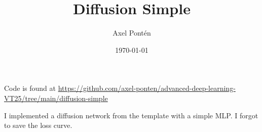 \documentclass[12pt, a4paper]{article}
\title{Diffusion Simple}
\author{Axel Pontén}
\date{\today}
\begin{document}
\maketitle

Code is found at \url{https://github.com/axel-ponten/advanced-deep-learning-VT25/tree/main/diffusion-simple}

I implemented a diffusion network from the template with a simple MLP. I forgot to save the loss curve.
\end{document}
